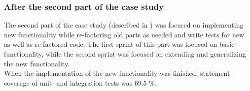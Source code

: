 \subsubsection{After the second part of the case study}

The second part of the case study (described in )
was focused on implementing new functionality while re-factoring old
parts as needed and write tests for new as well as re-factored code. The
first sprint of this part was focused on basic functionality, while the
second sprint was focused on extending and generalizing the new
functionality.\\

When the implementation of the new functionality was finished, statement
coverage of unit- and integration tests was 69.5 \%.

